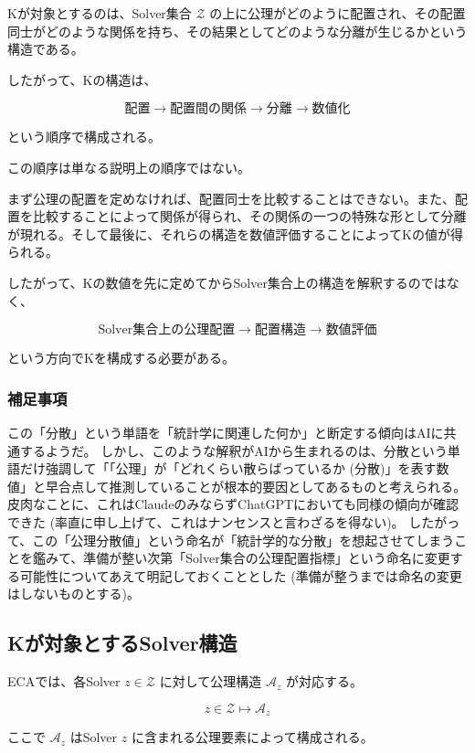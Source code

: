 Kが対象とするのは、Solver集合 $\mathcal{Z}$ の上に公理がどのように配置され、その配置同士がどのような関係を持ち、その結果としてどのような分離が生じるかという構造である。

したがって、Kの構造は、

\[
\boxed{
\text{配置}
\longrightarrow
\text{配置間の関係}
\longrightarrow
\text{分離}
\longrightarrow
\text{数値化}
}
\]

という順序で構成される。

この順序は単なる説明上の順序ではない。

まず公理の配置を定めなければ、配置同士を比較することはできない。また、配置を比較することによって関係が得られ、その関係の一つの特殊な形として分離が現れる。そして最後に、それらの構造を数値評価することによってKの値が得られる。

したがって、Kの数値を先に定めてからSolver集合上の構造を解釈するのではなく、

\[
\text{Solver集合上の公理配置}
\longrightarrow
\text{配置構造}
\longrightarrow
\text{数値評価}
\]

という方向でKを構成する必要がある。

\subsubsection{補足事項}
この「分散」という単語を「統計学に関連した何か」と断定する傾向はAIに共通するようだ。
しかし、このような解釈がAIから生まれるのは、分散という単語だけ強調して「「公理」が「どれくらい散らばっているか (分散)」を表す数値」と早合点して推測していることが根本的要因としてあるものと考えられる。
皮肉なことに、これはClaudeのみならずChatGPTにおいても同様の傾向が確認できた (率直に申し上げて、これはナンセンスと言わざるを得ない)。
したがって、この「公理分散値」という命名が「統計学的な分散」を想起させてしまうことを鑑みて、準備が整い次第「Solver集合の公理配置指標」という命名に変更する可能性についてあえて明記しておくこととした (準備が整うまでは命名の変更はしないものとする)。

\subsection{Kが対象とするSolver構造}

ECAでは、各Solver $z\in\mathcal{Z}$ に対して公理構造 $\mathcal{A}_z$ が対応する。

\[
z\in\mathcal{Z}
\longmapsto
\mathcal{A}_z
\]

ここで $\mathcal{A}_z$ はSolver $z$ に含まれる公理要素によって構成される。

